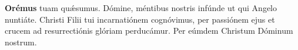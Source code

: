 \textbf{Orémus}
 tuam qu{\'\ae}sumus. Dómine, méntibus nostris infúnde ut qui Angelo nuntiáte.
Christi Filii tui incarnatiónem cognóvimus, per passiónem ejus et crucem ad resurrectiónis glóriam perducámur.
Per eúmdem Christum Dóminum nostrum.  